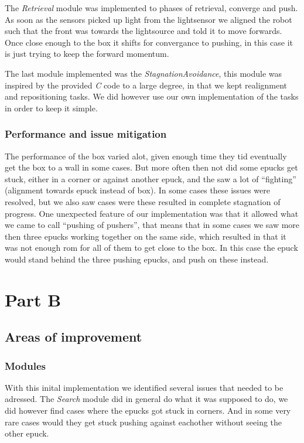 \documentclass[12pt]{article}
\newcommand{\shiftline}[0]{\hfill\newline\noindent}
\begin{document}
		\shiftline The \textit{Retrieval} module was implemented to phases of retrieval, converge and push. 
			As soon as the sensors picked up light from the lightsensor we aligned the robot such that the front was towards the lightsource and told it to move forwards. 
			Once close enough to the box it shifts for convergance to pushing, in this case it is just trying to keep the forward momentum.
	
		\shiftline The last module implemented was the \textit{StagnationAvoidance}, this module was inspired by the provided \textit{C} code to a large degree, 
		in that we kept realignment and repositioning tasks. 
		We did however use our own implementation of the tasks in order to keep it simple. 
			
		\subsubsection{Performance and issue mitigation}
			The performance of the box varied alot, given enough time they tid eventually get the box to a wall in some cases. But more often then not did some epucks get stuck, 
			either in a corner or against another epuck, and the saw a lot of ``fighting'' (alignment towards epuck instead of box). In some cases these issues were resolved, 
			but we also saw cases were these resulted in complete stagnation of progress. 
			One unexpected feature of our implementation was that it allowed what we came to call "`pushing of pushers"', that means that in some cases we saw more then three 
			epucks working together on the same side, which resulted in that it was not enough rom for all of them to get close to the box. In this case the epuck would stand behind
			the three pushing epucks, and push on these instead. 
				

\section{Part B}
	\subsection{Areas of improvement}
		\subsubsection{Modules}
			With this inital implementation we identified several issues that needed to be adressed. 
			The \textit{Search} module did in general do what it was supposed to do, we did however find cases where the epucks got stuck in corners. 
			And in some very rare cases would they get stuck pushing against eachother without seeing the other epuck.
		
\end{document}
